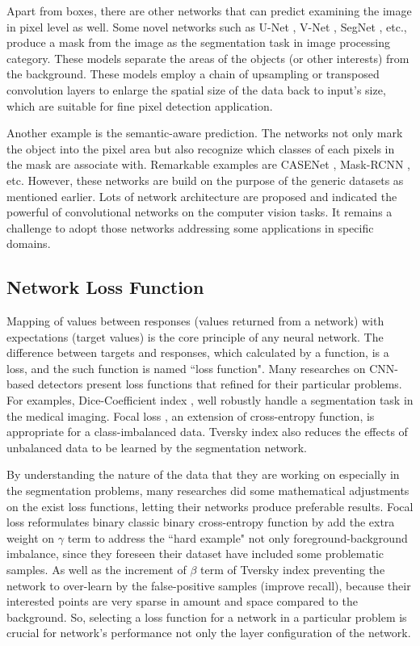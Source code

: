 \documentclass[default,pdflatex,iicol]{sn-jnl}%
\begin{document}
Apart from boxes, there are other networks that can predict examining the image in pixel level as well. Some novel networks such as U-Net \cite{unet}, V-Net \cite{vnet}, SegNet \cite{segnet}, etc., produce a mask from the image as the segmentation task in image processing category. These models separate the areas of the objects (or other interests) from the background. These models employ a chain of upsampling or transposed convolution layers to enlarge the spatial size of the data back to input's size, which are suitable for fine pixel detection application.

Another example is the semantic-aware prediction. The networks not only mark the object into the pixel area but also recognize which classes of each pixels in the mask are associate with. Remarkable examples are CASENet \cite{casenet}, Mask-RCNN \cite{maskrcnn}, etc. However, these networks are build on the purpose of the generic datasets as mentioned earlier. Lots of network architecture are proposed and indicated the powerful of convolutional networks on the computer vision tasks. It remains a challenge to adopt those networks addressing some applications in specific domains.

\subsection{Network Loss Function}\label{review_loss}
Mapping of values between responses (values returned from a network) with expectations (target values) is the core principle of any neural network. The difference  between targets and responses, which calculated by a function, is a loss, and the such function is named ``loss function". Many researches on CNN-based detectors present loss functions that refined for their particular problems. For examples, Dice-Coefficient index \cite{vnet, gendice}, well robustly handle a segmentation task in the medical imaging. Focal loss \cite{focalloss1}, an extension of cross-entropy function, is appropriate for a class-imbalanced data. Tversky index \cite{tverskyloss} also reduces the effects of unbalanced data to be learned by the segmentation network.

By understanding the nature of the data that they are working on especially in the segmentation problems, many researches did some mathematical adjustments on the exist loss functions, letting their networks produce preferable results. Focal loss \cite{focalloss1} reformulates binary classic binary cross-entropy function by add the extra weight on $\gamma$ term to address the ``hard example" not only foreground-background imbalance, since they foreseen their dataset have included some problematic samples. As well as the increment of $\beta$ term of Tversky index \cite{tverskyloss} preventing the network to over-learn by the false-positive samples (improve recall), because their interested points are very sparse in amount and space compared to the background. So, selecting a loss function for a network in a particular problem is crucial for network's performance not only the layer configuration of the network.
\end{document}

